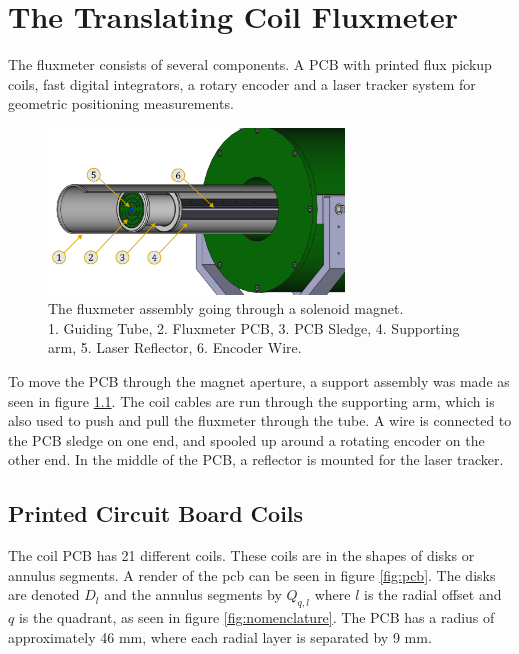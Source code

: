 \chapter{The Translating Coil Fluxmeter}
The fluxmeter consists of several components. A PCB with
printed flux pickup coils, fast digital integrators, a rotary
encoder and a laser tracker system for geometric positioning measurements.

\begin{figure}[!h]
    \centering
    \includegraphics[width=0.7\textwidth]{figs/elena}
    \caption{The fluxmeter assembly going through a solenoid magnet. \\
        1. Guiding Tube, 2. Fluxmeter PCB, 3. PCB Sledge, 4. Supporting arm,
        5. Laser Reflector, 6. Encoder Wire.}
    \label{fig:elena}
\end{figure}

To move the PCB through the magnet aperture, a support assembly was made as
seen in figure \ref{fig:elena}. The coil cables are run through the supporting
arm, which is also used to push and pull the fluxmeter through the tube. A
wire is connected to the PCB sledge on one end, and spooled up around
a rotating encoder on the other end. In the middle of the PCB, a
reflector is mounted for the laser tracker.

\section{Printed Circuit Board Coils}
The coil PCB has 21 different coils.
These coils are in the shapes of disks or annulus segments.
A render of the pcb can be seen in figure
\ref{fig:pcb}. The disks are denoted $D_l$ and the
annulus segments by $Q_{q, l}$ where $l$ is the radial offset and
$q$ is the quadrant, as seen in figure \ref{fig:nomenclature}. The
PCB has a radius of approximately 46 mm, where each radial layer
is separated by 9 mm.

